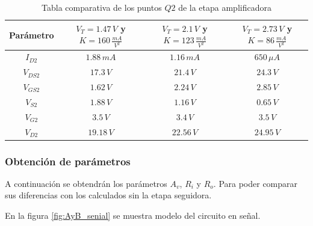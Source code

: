 \documentclass[10pt,spanish,a4paper,notitlepage]{article}
\begin{document}
\begin{table}[H]
\centering
\begin{tabular}{|c|c|c|c|} 
\hline
Parámetro & $V_{T}=1.47\,\unit{V}$ y $K=160\,\unit{\frac{mA}{V^2}}$ & 
$V_{T}=2.1\,\unit{V}$ y $K=123\,\unit{\frac{mA}{V^2}}$ &
$V_{T}=2.73\,\unit{V}$ y $K=86\,\unit{\frac{mA}{V^2}}$ \\ \hline
$I_{D2}$ & $1.88\,\unit{mA}$ & $1.16\,\unit{mA}$ & $650\,\unit{\mu A}$\\ \hline
$V_{DS2}$ & $17.3\,\unit{V}$ & $21.4\,\unit{V}$ & $24.3\,\unit{V}$\\ \hline
$V_{GS2}$ & $1.62\,\unit{V}$  & $2.24\,\unit{V}$ & $2.85\,\unit{V}$\\ \hline 
$V_{S2}$ & $1.88\,\unit{V}$ &  $1.16\,\unit{V}$ & $0.65\,\unit{V}$\\ \hline
$V_{G2}$ & $3.5\,\unit{V}$ &  $3.4\,\unit{V}$ & $3.5\,\unit{V}$\\ \hline
$V_{D2}$ & $19.18\,\unit{V}$ &  $22.56\,\unit{V}$ & $24.95\,\unit{V}$\\ \hline
\end{tabular}
\caption{Tabla comparativa de los puntos $Q2$ de la etapa amplificadora}
\label{table:B_Q_acoplado}
\end{table}


\subsubsection{Obtención de parámetros}

A continuación se obtendrán los parámetros $A_v$, $R_i$ y $R_o$.
Para poder comparar sus diferencias con los calculados sin la
etapa seguidora.

En la figura \ref{fig:AyB_senial} se muestra modelo del circuito en señal.
\end{document}
